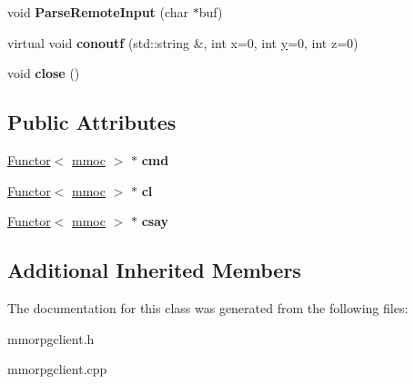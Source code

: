 \begin{DoxyCompactItemize}
\item 
void {\bfseries Parse\+Remote\+Input} (char $\ast$buf)\hypertarget{classmmoc_a982da5e6cf7df9ddf1a9783e1180c296}{}\label{classmmoc_a982da5e6cf7df9ddf1a9783e1180c296}

\item 
virtual void {\bfseries conoutf} (std\+::string \&, int x=0, int \hyperlink{IceUtils_8h_aa7ffaed69623192258fb8679569ff9ba}{y}=0, int z=0)\hypertarget{classmmoc_af6bc7ce086f7c6ac68e30b375604e959}{}\label{classmmoc_af6bc7ce086f7c6ac68e30b375604e959}

\item 
void {\bfseries close} ()\hypertarget{classmmoc_a0ace74772640635c00d5954e1722dea6}{}\label{classmmoc_a0ace74772640635c00d5954e1722dea6}

\end{DoxyCompactItemize}
\subsection*{Public Attributes}
\begin{DoxyCompactItemize}
\item 
\hyperlink{classFunctor}{Functor}$<$ \hyperlink{classmmoc}{mmoc} $>$ $\ast$ {\bfseries cmd}\hypertarget{classmmoc_aa2aad1c935488d82ddfe7861311b5020}{}\label{classmmoc_aa2aad1c935488d82ddfe7861311b5020}

\item 
\hyperlink{classFunctor}{Functor}$<$ \hyperlink{classmmoc}{mmoc} $>$ $\ast$ {\bfseries cl}\hypertarget{classmmoc_aebfe306e4d82bd1dc0027867efcc9a4e}{}\label{classmmoc_aebfe306e4d82bd1dc0027867efcc9a4e}

\item 
\hyperlink{classFunctor}{Functor}$<$ \hyperlink{classmmoc}{mmoc} $>$ $\ast$ {\bfseries csay}\hypertarget{classmmoc_a96e341119db7e51dd71d2d3643763d8d}{}\label{classmmoc_a96e341119db7e51dd71d2d3643763d8d}

\end{DoxyCompactItemize}
\subsection*{Additional Inherited Members}


The documentation for this class was generated from the following files\+:\begin{DoxyCompactItemize}
\item 
mmorpgclient.\+h\item 
mmorpgclient.\+cpp\end{DoxyCompactItemize}
